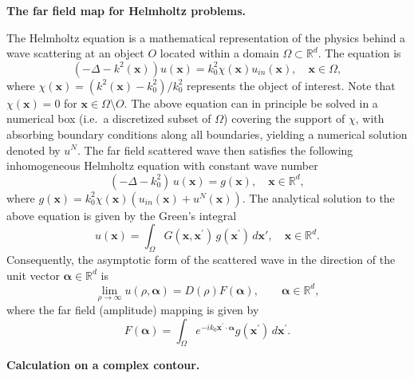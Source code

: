 \documentclass{report}
\begin{document}
\textbf{The far field map for Helmholtz problems.}

The Helmholtz equation is a mathematical representation of the physics
behind a wave scattering at an object $O$ located within a domain $\Omega
\subset \mathbb{R}^d$. The equation is
\begin{equation} \label{eq:helmholtz_in}
\left(-\Delta - k^2(\boldsymbol{x})\right) u(\boldsymbol{x}) = k_0^2
\chi(\boldsymbol{x})u_{in}(\boldsymbol{x}), \quad \boldsymbol{x} \in
\Omega,
\end{equation}
where $\chi(\boldsymbol{x}) = (k^2(\boldsymbol{x})-k_0^2)/k_0^2$
represents the object of interest. Note that $\chi(\boldsymbol{x}) = 0$
for $\boldsymbol{x} \in \Omega \setminus O$. The above equation can in
principle be solved in a numerical box (i.e.~a discretized subset of
$\Omega$) covering the support of $\chi$, with absorbing boundary
conditions along all boundaries, yielding a numerical solution denoted by
$u^N$. The far field scattered wave then satisfies the following
inhomogeneous Helmholtz equation with constant wave number
\begin{equation} \label{eq:HHR}
\left(-\Delta - k_0^2\right) \, u(\boldsymbol{x}) = g(\boldsymbol{x}),
\quad \boldsymbol{x} \in \mathbb{R}^d,
\end{equation}
where $g(\boldsymbol{x})=k_0^2 \chi(\boldsymbol{x})
(u_{in}(\boldsymbol{x})+u^N(\boldsymbol{x}))$. The analytical solution to
the above equation is given by the Green's integral
\begin{equation} \label{eq:scint}
u(\boldsymbol{x}) = \int_{\Omega} G(\boldsymbol{x},
\boldsymbol{x}^\prime) \, g(\boldsymbol{x}^\prime) \, d\boldsymbol{x}',
\quad \boldsymbol{x} \in \mathbb{R}^d.
\end{equation}
Consequently, the asymptotic form of the scattered wave in the direction
of the unit vector $\boldsymbol\alpha \in \mathbb{R}^d$ is
\begin{equation} \label{eq:FFusc}
\lim_{\rho \to \infty} u(\rho,\boldsymbol\alpha) = D(\rho)
F(\boldsymbol\alpha), \qquad \boldsymbol\alpha \in \mathbb{R}^{d},
\end{equation}
where the far field (amplitude) mapping is given by
\begin{equation} \label{eq:FFmap}
F(\boldsymbol \alpha) = \int_\Omega e^{-ik_0 \boldsymbol{x}^\prime \cdot
\boldsymbol \alpha} g(\boldsymbol{x}^\prime) \, d\boldsymbol{x}^\prime.
\end{equation}

\textbf{Calculation on a complex contour.}
\end{document}
